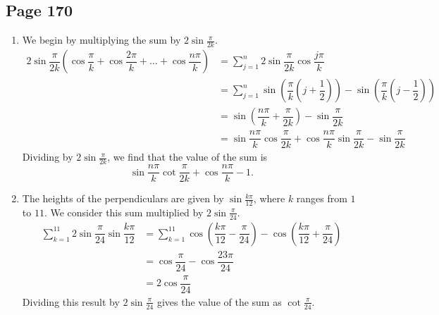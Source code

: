\documentclass{article}
\newenvironment{solutions}[1]
{\subsection*{#1}
 \begin{enumerate}[leftmargin=1.5em]}
{\end{enumerate}}
\newcommand{\solution}{\item}
\begin{document}
\begin{solutions}{Page 170}
\solution %
We begin by multiplying the sum by $2\sin{\tfrac{\pi}{2k}}$.
\begin{align*}
2\sin{\dfrac{\pi}{2k}} \left(\cos{\dfrac{\pi}{k}} + \cos{\dfrac{2\pi}{k}} + \ldots + \cos{\dfrac{n\pi}{k}} \right) &= \sum_{j=1}^{n} 2\sin{\dfrac{\pi}{2k}}\cos{\dfrac{j\pi}{k}} \\
&= \sum_{j=1}^{n} \sin\left(\dfrac{\pi}{k}\left(j+\dfrac{1}{2}\right)\right) - \sin\left(\dfrac{\pi}{k}\left(j-\dfrac{1}{2}\right)\right) \\
&= \sin\left(\dfrac{n\pi}{k} + \dfrac{\pi}{2k}\right) - \sin{\dfrac{\pi}{2k}} \\
&= \sin{\dfrac{n\pi}{k}}\cos{\dfrac{\pi}{2k}} + \cos{\dfrac{n\pi}{k}}\sin{\dfrac{\pi}{2k}} - \sin{\dfrac{\pi}{2k}}
\end{align*}
Dividing by $2\sin{\tfrac{\pi}{2k}}$, we find that the value of the sum is
\[
\sin{\dfrac{n\pi}{k}}\cot{\dfrac{\pi}{2k}} + \cos{\dfrac{n\pi}{k}} - 1.
\]
\solution %
The heights of the perpendiculars are given by $\sin{\tfrac{k\pi}{12}}$, where $k$ ranges from $1$ to $11$. We consider this sum multiplied by $2\sin{\tfrac{\pi}{24}}$.
\begin{align*}
\sum_{k=1}^{11} 2\sin{\dfrac{\pi}{24}}\sin{\dfrac{k\pi}{12}} &= \sum_{k=1}^{11} \cos\left(\dfrac{k\pi}{12}-\dfrac{\pi}{24}\right) - \cos\left(\dfrac{k\pi}{12}+\dfrac{\pi}{24}\right) \\
&= \cos{\dfrac{\pi}{24}}-\cos{\dfrac{23\pi}{24}} \\
&= 2\cos{\dfrac{\pi}{24}}
\end{align*}
Dividing this result by $2\sin{\tfrac{\pi}{24}}$ gives the value of the sum as $\cot{\tfrac{\pi}{24}}$.


\end{solutions}
\end{document}
